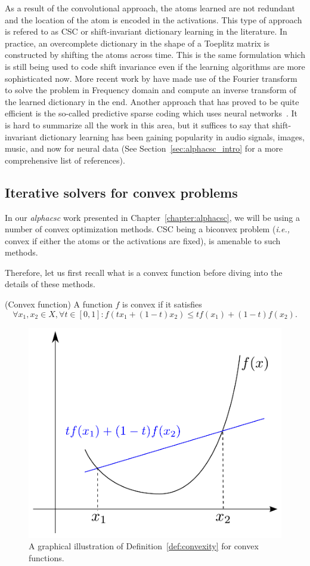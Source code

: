 As a result of the convolutional approach, the atoms learned are not redundant and the location of the atom is encoded in the activations. This type of approach is refered to as \ac{CSC} or shift-invariant dictionary learning in the literature. In practice, an overcomplete dictionary in the shape of a Toeplitz matrix is constructed by shifting the atoms across time. This is the same formulation which is still being used to code shift invariance even if the learning algorithms are more sophisticated now. More recent work by \cite{grosse2012shift} have made use of the Fourier transform to solve the problem in Frequency domain and compute an inverse transform of the learned dictionary in the end. Another approach that has proved to be quite efficient is the so-called predictive sparse coding which uses neural networks~\citep{kavukcuoglu2010learning}. It is hard to summarize all the work in this area, but it suffices to say that shift-invariant dictionary learning has been gaining popularity in audio signals, images, music, and now for neural data (See Section~\ref{sec:alphacsc_intro} for a more comprehensive list of references).

\subsection{Iterative solvers for convex problems}

In our \emph{alphacsc} work presented in Chapter~\ref{chapter:alphacsc}, we will be using a number of convex optimization methods. CSC being a biconvex problem (\textit{i.e.,}  convex if either the atoms or the activations are fixed), is amenable to such methods.

Therefore, let us first recall what is a convex function before diving into the details of these methods.
\vspace{\parskip}
\begin{definition}{(Convex function)}
\label{def:convexity}
A function $f$ is convex if it satisfies
\begin{equation}
\forall x_1, x_2 \in X, \forall t \in [0, 1]: f(tx_1 + (1 - t)x_2) \leq tf(x_1) + (1 - t)f(x_2).
\end{equation}
\end{definition}

\begin{figure}[htb]
\begin{center}
   \includegraphics[width=0.5\linewidth]{figures/convex_functions.pdf}
\end{center}
   \caption[Graphical illustration of convexity]{A graphical illustration of Definition~\ref{def:convexity} for convex functions.}
   \label{fig:convexity}
\end{figure}

